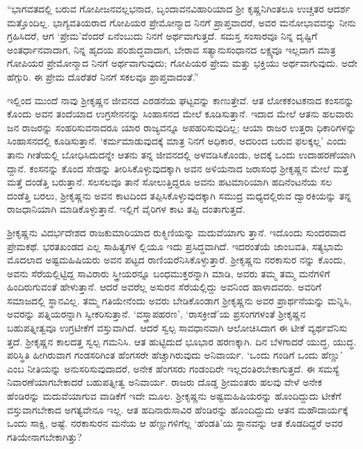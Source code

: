 “ಭಾಗವತದಲ್ಲಿ ಬರುವ ಗೋಪೀಜನವಲ್ಲಭನಾದ, ಬೃಂದಾವನವಿಹಾರಿಯಾದ ಶ್ರೀ ಕೃಷ್ಣನಿಗಿಂತಲೂ ಉಚ್ಚತರ ಆದರ್ಶ ಮತ್ತೊಂದಿಲ್ಲ. ಭಾಗ್ಯವತಿಯರಾದ ಗೋಪಿಯರ ಪ್ರೇಮೋನ್ಮಾದ ನಿನಗೆ ಪ್ರಾಪ್ತವಾದರೆ, ಅವರ ಮನೋಭಾವವನ್ನು ನೀನು ಗ್ರಹಿಸಿದರೆ, ಆಗ ‘ಪ್ರೇಮ’ವೆಂದರೆ ಏನೆಂಬುದು ನಿನಗೆ ಅರ್ಥವಾಗುತ್ತದೆ. ಸಮಸ್ತ ಸಂಸಾರವೂ ನಿನ್ನ ದೃಷ್ಟಿಗೆ ಅಂತರ್ಧಾನವಾದಾಗ, ನಿನ್ನ ಹೃದಯ ಪರಿಶುದ್ಧವಾದಾಗ, ಬೇರಾವ ಸತ್ಯಾನುಸಂಧಾನದ ಲಕ್ಷ್ಯವೂ ಇಲ್ಲದಾಗ ಮಾತ್ರ ಗೋಪಿಯರ ಪ್ರೇಮೋನ್ಮಾದ ನಿನಗೆ ಅರ್ಥವಾಗುವುದು; ಗೋಪಿಯರ ಪ್ರೇಮ ಮತ್ತು ಭಕ್ತಿಯು ಅರ್ಥವಾಗುವುದು. ಅದೇ ಹೆಗ್ಗುರಿ. ಈ ಪ್ರೇಮ ದೊರೆತರೆ ನಿನಗೆ ಸಕಲವೂ ಪ್ರಾಪ್ತವಾದಂತೆ.”

ಇಲ್ಲಿಂದ ಮುಂದೆ ನಾವು ಶ್ರೀಕೃಷ್ಣನ ಜೀವನದ ಎರಡನೆಯ ಘಟ್ಟವನ್ನು ಕಾಣುತ್ತೇವೆ. ಆತ ಲೋಕಕಂಟಕನಾದ ಕಂಸನನ್ನು ಕೊಂದು ಅವನ ತಂದೆಯಾದ ಉಗ್ರಸೇನನನ್ನು ಸಿಂಹಾಸನದ ಮೇಲೆ ಕೂಡಿಸುತ್ತಾನೆ. ಇದಾದ ಮೇಲೆ ಆತನು ಹಲವಾರು ಜನ ರಾಜರನ್ನು ಸಂಹರಿಸುವನಾದರೂ ಯಾರ ರಾಜ್ಯವನ್ನೂ ಅಪಹರಿಸುವುದಿಲ್ಲ; ಆಯಾ ರಾಜರ ಉತ್ತರಾ ಧಿಕಾರಿಗಳನ್ನು ಸಿಂಹಾಸನದಲ್ಲಿ ಕೂಡಿಸುತ್ತಾನೆ. ‘ಕರ್ಮಮಾಡುವುದಕ್ಕೆ ಮಾತ್ರ ನಿನಗೆ ಅಧಿಕಾರ, ಅದರಿಂದ ಬರುವ ಫಲಕ್ಕಲ್ಲ’ ಎಂದು ತಾನು ಗೀತೆಯಲ್ಲಿ ಬೋಧಿಸಿದುದನ್ನೇ ಆತನು ತನ್ನ ಜೀವನದಲ್ಲಿ ಅಳವಡಿಸಿಕೊಂಡು, ಅದಕ್ಕೆ ಒಂದು ಉದಾಹರಣೆಯಾಗಿ ದ್ದಾನೆ. ಕಂಸನನ್ನು ಕೊಂದ ಸೇಡನ್ನು ತೀರಿಸಿಕೊಳ್ಳುವುದಕ್ಕಾಗಿ ಅವನ ಅಳಿಯನಾದ ಜರಾಸಂಧ ಶ್ರೀಕೃಷ್ಣನ ಮೇಲೆ ಮತ್ತೆ ಮತ್ತೆ ದಂಡೆತ್ತಿ ಬರುತ್ತಾನೆ. ಸಲಸಲವೂ ತಾನೆ ಸೋಲುತ್ತಿದ್ದರೂ ಅವನು ಹಟಮಾರಿಯಾಗಿ ಹದಿನೆಂಟನೆಯ ಸಲ ದಂಡೆತ್ತಿ ಬರಲು, ಶ್ರೀಕೃಷ್ಣನು ಅವನ ಕಾಟದಿಂದ ತಪ್ಪಿಸಿಕೊಳ್ಳುವುದಕ್ಕಾಗಿ ಸಮುದ್ರ ಮಧ್ಯದಲ್ಲಿರುವ ದ್ವಾರಕಿಯನ್ನು ತನ್ನ ರಾಜಧಾನಿಯಾಗಿ ಮಾಡಿಕೊಳ್ಳುತ್ತಾನೆ. ಇಲ್ಲಿಗೆ ವೈರಿಗಳ ಕಾಟ ತಪ್ಪಿ ದಂತಾಗುತ್ತದೆ.

ಶ್ರೀಕೃಷ್ಣನು ವಿದರ್ಭದೇಶದ ರಾಜಕುಮಾರಿಯಾದ ರುಕ್ಮಿಣಿಯನ್ನು ಮದುವೆಯಾಗು ತ್ತಾನೆ. ಇದೊಂದು ಸುಂದರವಾದ ಪ್ರೇಮಕಥೆ. ಭರತಖಂಡದ ಎಲ್ಲ ಸಾಹಿತ್ಯಗಳ ಲ್ಲಿಯೂ ಇದು ಪ್ರಸಿದ್ಧವಾಗಿದೆ. ಇದರಂತೆಯೆ ಜಾಂಬವತಿ, ಸತ್ಯಭಾಮೆ ಮೊದಲಾದ ಅಷ್ಟಮಹಿಷಿಯರು ಅವನ ಪಟ್ಟದ ರಾಣಿಯರೆನಿಸಿಕೊಳ್ಳುತ್ತಾರೆ. ಶ್ರೀಕೃಷ್ಣನು ನರಕಾಸುರ ನನ್ನು ಕೊಂದು, ಅವನು ಸೆರೆಯಲ್ಲಿಟ್ಟಿದ್ದ ಸಾವಿರಾರು ಸ್ತ್ರೀಯರನ್ನೂ ಬಂಧಮುಕ್ತರನ್ನಾಗಿ ಮಾಡಿ, ಅವರು ತಮ್ಮ ತಮ್ಮ ಮನೆಗಳಿಗೆ ಹಿಂದಿರುಗುವಂತೆ ಹೇಳುತ್ತಾನೆ. ಆದರೆ ಅವರೆಲ್ಲ ಅಸುರನ ಸೆರೆಯಲ್ಲಿದ್ದು ಅವನಿಂದ ಹಾಳಾದವರು. ಅವರಿಗೆ ಸಮಾಜದಲ್ಲಿ ಸ್ಥಾನವಿಲ್ಲ. ತಮ್ಮ ಗತಿಯೇನೆಂದು ಅವರು ಬೇಡಿಕೊಂಡಾಗ ಶ್ರೀಕೃಷ್ಣನು ಅವರ ಪ್ರಾರ್ಥನೆಯನ್ನು ಮನ್ನಿಸಿ, ಅವರನ್ನು ಪತ್ನಿಯರನ್ನಾಗಿ ಸ್ವೀಕರಿಸುತ್ತಾನೆ. ‘ವಸ್ತ್ರಾಪಹರಣ’, ‘ರಾಸಕ್ರೀಡೆ’ಯ ಪ್ರಸಂಗಗಳಂತೆ ಶ್ರೀಕೃಷ್ಣನ ಬಹುಪತ್ನೀತ್ವವೂ ಉಗ್ರಟೀಕೆಗೆ ವಸ್ತುವಾಗಿದೆ. ಆದರೆ ಸ್ವಲ್ಪ ಸಾವಧಾನವಾಗಿ ಆಲೋಚಿಸಿದಾಗ ಈ ಟೀಕೆ ವ್ಯರ್ಥವೆನಿಸು ತ್ತದೆ. ಶ್ರೀಕೃಷ್ಣನ ಕಾಲದತ್ತ ಸ್ವಲ್ಪ ಗಮನಿಸಿ. ಆತ ಹುಟ್ಟಿದುದೆ ಭೂಭಾರ ಹರಣಕ್ಕಾಗಿ. ದಿನ ಬೆಳಗಾದರೆ ಯುದ್ಧ, ಯುದ್ಧ. ಪರಿಸ್ಥಿತಿ ಹೀಗಿರುವಾಗ ಗಂಡಸರಿಗಿಂತ ಹೆಂಗಸರೇ ಹೆಚ್ಚಾಗಿರುವುದು ಅನಿವಾರ್ಯ. ‘ಒಂದು ಗಂಡಿಗೆ ಒಂದು ಹೆಣ್ಣು’ ಎಂಬ ನೀತಿಯನ್ನು ಅನುಸರಿಸುವುದಾದರೆ, ಅನೇಕ ಹೆಂಗಸರು ಗಂಡಂದಿರೇ ಇಲ್ಲದಂತಿರಬೇಕಾಗುತ್ತದೆ. ಈ ಸಮಸ್ಯೆ ನಿವಾರಣೆಯಾಗಬೇಕಾದರೆ ಬಹುಪತ್ನೀತ್ವ ಅನಿವಾರ್ಯ. ರಾಜರು ದೊಡ್ಡ ಶ್ರೀಮಂತರು ಹಲವು ವೇಳೆ ಅನೇಕ ಹೆಂಡಿರನ್ನು ಮದುವೆಯಾಗುವ ವಾಡಿಕೆಗೆ ಇದೇ ಮೂಲ. ಶ್ರೀಕೃಷ್ಣನು ಅಷ್ಟಮಹಿಷಿಯರನ್ನು ಹೊಂದಿದ್ದುದು ಟೀಕೆಗೆ ವಸ್ತುವಾಗಬೇಕಾದ ಅಗತ್ಯವೇನೂ ಇಲ್ಲ. ಆತ ಹದಿನಾರುಸಾವಿರ ಹೆಂಡಿರನ್ನು ಹೊಂದಿದ್ದುದು ಆತನ ಮಹೌದಾರ್ಯಕ್ಕೆ ಒಂದು ಸಾಕ್ಷಿ, ಅಷ್ಟೆ. ನರಕಾಸುರನ ಮನೆಯ ಆ ಹೆಣ್ಣುಗಳಿಗೆಲ್ಲ ‘ಹೆಂಡತಿ’ಯ ಸ್ಥಾನವನ್ನು ಆತ ಕೊಡದಿದ್ದರೆ ಅವರ ಗತಿಯೇನಾಗಬೇಕಾಗಿತ್ತು?

